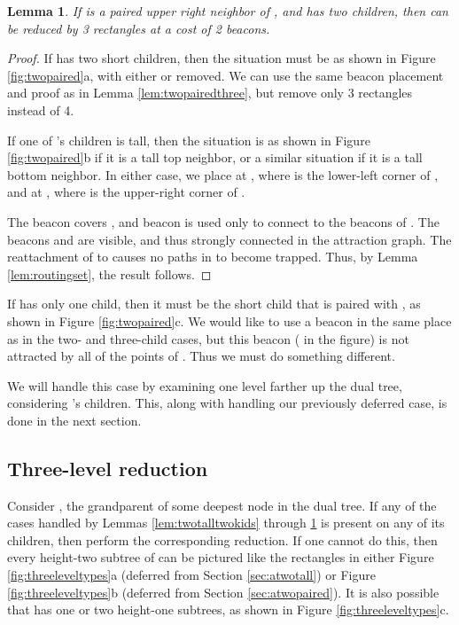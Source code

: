 \documentclass{article}
\newtheorem{lemma}{Lemma}
\begin{document}
		\begin{lemma}\label{lem:twopairedtwo}
			If  is a paired upper right neighbor of , and  has two
			children, then  can be reduced by 3 rectangles at a cost of 2 beacons.
		\end{lemma}
		\begin{proof}
			If  has two short children, then the situation must be
			as shown in Figure \ref{fig:twopaired}a, with either  or 
			removed.  We can use the same beacon placement and proof as in Lemma
			\ref{lem:twopairedthree}, but remove only 3 rectangles instead of 4.
			
			If one of 's children is tall, then the situation is as shown
			in Figure \ref{fig:twopaired}b if it is a tall top neighbor, or a similar
			situation if it is a tall bottom neighbor.  In either case, we 
			place  at , where  is
			the lower-left corner of , and  at ,
			where  is the upper-right corner of .
	
			The beacon  covers , and 
			beacon  is used only to connect  to the beacons of .
			The beacons  and  are visible, and thus strongly connected in the
			attraction graph.  
			The reattachment of  to  causes no paths in  to become
			trapped. Thus, by Lemma \ref{lem:routingset}, the result follows.
		\end{proof} 
		
		If  has only one child, then it must be the short child  that is
		paired with , as shown in Figure \ref{fig:twopaired}c.  We would like
		to use a beacon in the same place as  in the two- and three-child cases,
		but this beacon ( in the figure) is not attracted by all of the points of
		.  Thus we must do something different.
		
		We will handle this case by examining one level farther up the dual tree,
		considering 's children.  This, along with handling our previously
		deferred case, is done in the next section.

	\subsection{Three-level reduction}\label{sec:deferred}

		Consider , the grandparent of some deepest  node in the dual tree.
		If any of the cases handled by Lemmas \ref{lem:twotalltwokids} through
		\ref{lem:twopairedtwo} is present on any of its children, then perform the
		corresponding reduction.
		If one cannot do this, then every height-two subtree of  can be pictured
		like the rectangles  in
		either Figure \ref{fig:threeleveltypes}a 
		(deferred from Section \ref{sec:atwotall})
		or Figure \ref{fig:threeleveltypes}b
		(deferred from Section \ref{sec:atwopaired}).
		It is also possible that  has one or two height-one subtrees, as shown in
		Figure \ref{fig:threeleveltypes}c.
				
\end{document}
